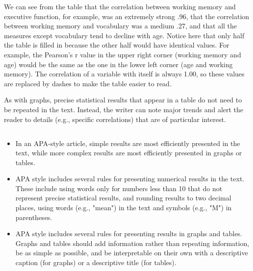 We can see from the table that the correlation between working memory and executive function, for example, was an extremely strong .96, that the correlation between working memory and vocabulary was a medium .27, and that all the measures except vocabulary tend to decline with age. Notice here that only half the table is filled in because the other half would have identical values. For example, the Pearson's r value in the upper right corner (working memory and age) would be the same as the one in the lower left corner (age and working memory). The correlation of a variable with itself is always 1.00, so these values are replaced by dashes to make the table easier to read.


As with graphs, precise statistical results that appear in a table do not need to be repeated in the text. Instead, the writer can note major trends and alert the reader to details (e.g., specific correlations) that are of particular interest.
 




\subsection{}
\begin{fullwidth}
\begin{itemize}
\item In an APA-style article, simple results are most efficiently presented in the text, while more complex results are most efficiently presented in graphs or tables.

\item APA style includes several rules for presenting numerical results in the text. These include using words only for numbers less than 10 that do not represent precise statistical results, and rounding results to two decimal places, using words (e.g., "mean") in the text and symbols (e.g., "M") in parentheses.

\item APA style includes several rules for presenting results in graphs and tables. Graphs and tables should add information rather than repeating information, be as simple as possible, and be interpretable on their own with a descriptive caption (for graphs) or a descriptive title (for tables).

\end{itemize}
\end{fullwidth}

 

